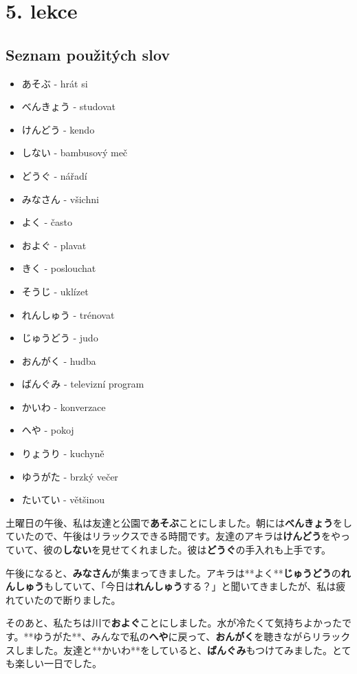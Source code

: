 \section{5. lekce}

\subsection*{Seznam použitých slov}

\begin{itemize}
    \item あそぶ - hrát si
    \item べんきょう - studovat
    \item けんどう - kendo
    \item しない - bambusový meč
    \item どうぐ - nářadí
    \item みなさん - všichni
    \item よく - často
    \item およぐ - plavat
    \item きく - poslouchat
    \item そうじ - uklízet
    \item れんしゅう - trénovat
    \item じゅうどう - judo
    \item おんがく - hudba
    \item ばんぐみ - televizní program
    \item かいわ - konverzace
    \item へや - pokoj
    \item りょうり - kuchyně
    \item ゆうがた - brzký večer
    \item たいてい - většinou
\end{itemize}

土曜日の午後、私は友達と公園で\textbf{あそぶ}ことにしました。朝には\textbf{べんきょう}をしていたので、午後はリラックスできる時間です。友達のアキラは\textbf{けんどう}をやっていて、彼の\textbf{しない}を見せてくれました。彼は\textbf{どうぐ}の手入れも上手です。

午後になると、\textbf{みなさん}が集まってきました。アキラは**よく**\textbf{じゅうどう}の\textbf{れんしゅう}もしていて、「今日は\textbf{れんしゅう}する？」と聞いてきましたが、私は疲れていたので断りました。

そのあと、私たちは川で\textbf{およぐ}ことにしました。水が冷たくて気持ちよかったです。**ゆうがた**、みんなで私の\textbf{へや}に戻って、\textbf{おんがく}を聴きながらリラックスしました。友達と**かいわ**をしていると、\textbf{ばんぐみ}もつけてみました。とても楽しい一日でした。
